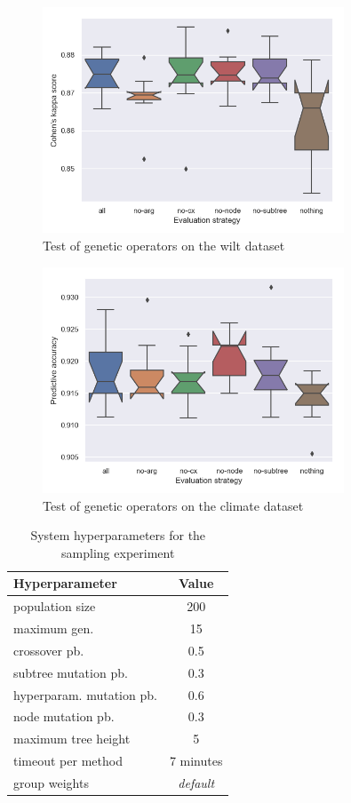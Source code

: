 \begin{figure}[pt]\centering
\includegraphics[width=0.8\textwidth]{../img/wilt-mut-redo.png}
\caption{Test of genetic operators on the wilt dataset}
\label{pic04:mut-wilt}
\end{figure}

\begin{figure}[pt]\centering
\includegraphics[width=0.8\textwidth]{../img/climate-mut-redo.png}
\caption{Test of genetic operators on the climate dataset}
\label{pic04:mut-climate}
\end{figure}

\begin{table}[ht]
\centering
\caption{System hyperparameters for the sampling experiment}\label{tab04:exp2:setting}
\begin{tabular}{l c}
\toprule
\textbf{\upshape Hyperparameter} & \textbf{Value} \\
\midrule
population size & 200 \\
maximum gen. & 15 \\
crossover pb. & 0.5 \\
subtree mutation pb. & 0.3 \\
hyperparam. mutation pb. & 0.6 \\
node mutation pb. & 0.3 \\
maximum tree height & 5 \\
timeout per method  & 7 minutes \\
group weights & \textit{default} \\
\bottomrule

\end{tabular}

\end{table}



